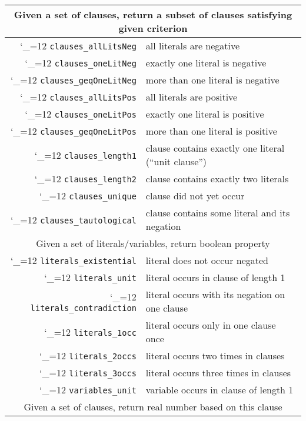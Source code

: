 \newcommand{\satf}{\begingroup \catcode`_=12 \dosatf}
\newcommand{\dosatf}[1]{\texttt{#1}\endgroup}
\newcommand\sath[1]{\hline \multicolumn{2}{|c|}{#1} \\ \hline}
\begin{table}[!ht]
  \begin{tabular}{rl}
    \sath{Given a set of clauses, return a subset of clauses satisfying given criterion}
    \satf{clauses_allLitsNeg}     & all literals are negative \\
    \satf{clauses_oneLitNeg}      & exactly one literal is negative \\
    \satf{clauses_geqOneLitNeg}   & more than one literal is negative \\
    \satf{clauses_allLitsPos}     & all literals are positive \\
    \satf{clauses_oneLitPos}      & exactly one literal is positive \\
    \satf{clauses_geqOneLitPos}   & more than one literal is positive \\
    \satf{clauses_length1}        & clause contains exactly one literal (\enquote{unit clause}) \\
    \satf{clauses_length2}        & clause contains exactly two literals \\
    \satf{clauses_unique}         & clause did not yet occur \\
    \satf{clauses_tautological}   & clause contains some literal and its negation \\
    \sath{Given a set of literals/variables, return boolean property}
    \satf{literals_existential}   & literal does not occur negated \\
    \satf{literals_unit}          & literal occurs in clause of length 1 \\
    \satf{literals_contradiction} & literal occurs with its negation on one clause \\
    \satf{literals_1occ}          & literal occurs only in one clause once \\
    \satf{literals_2occs}         & literal occurs two times in clauses \\
    \satf{literals_3occs}         & literal occurs three times in clauses \\
    \satf{variables_unit}         & variable occurs in clause of length 1 \\
    \sath{Given a set of clauses, return real number based on this clause}

\end{tabular}
\end{table}
